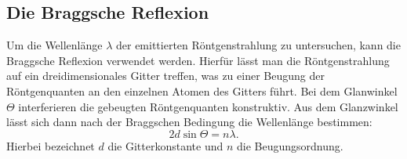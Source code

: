 \subsection{Die Braggsche Reflexion}
Um die Wellenlänge $\lambda$ der emittierten Röntgenstrahlung zu untersuchen,
kann die Braggsche Reflexion verwendet werden. Hierfür lässt man die Röntgenstrahlung
auf ein dreidimensionales Gitter treffen, was zu einer Beugung der Röntgenquanten
an den einzelnen Atomen des Gitters führt.  Bei dem Glanwinkel $\Theta$ interferieren
die gebeugten Röntgenquanten konstruktiv. Aus dem Glanzwinkel lässt sich dann
nach der Braggschen Bedingung die Wellenlänge bestimmen:
\begin{equation}
  2 d \sin \Theta = n \lambda.
  \label{eqn:braggtheorie}
\end{equation}
Hierbei bezeichnet $d$ die Gitterkonstante und $n$ die Beugungsordnung.
